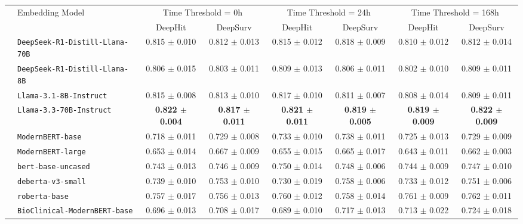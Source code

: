 \begin{adjustbox}{width=\textwidth}
\begin{tabular}{c lcccccc}
\toprule
 & \multirow{2}{*}{Embedding Model} &
 \multicolumn{2}{c}{Time Threshold = 0h} &
 \multicolumn{2}{c}{Time Threshold = 24h} &
 \multicolumn{2}{c}{Time Threshold = 168h} \\
\cmidrule(lr){3-4} \cmidrule(lr){5-6} \cmidrule(lr){7-8}
 &  & DeepHit & DeepSurv & DeepHit & DeepSurv & DeepHit & DeepSurv \\
\midrule
& \texttt{DeepSeek-R1-Distill-Llama-70B} & 0.815 $\pm$ 0.010 & 0.812 $\pm$ 0.013 & 0.815 $\pm$ 0.012 & 0.818 $\pm$ 0.009 & 0.810 $\pm$ 0.012 & 0.812 $\pm$ 0.014 \\
& \texttt{DeepSeek-R1-Distill-Llama-8B}  & 0.806 $\pm$ 0.015 & 0.803 $\pm$ 0.011 & 0.809 $\pm$ 0.013 & 0.806 $\pm$ 0.011 & 0.802 $\pm$ 0.010 & 0.809 $\pm$ 0.011 \\
& \texttt{Llama-3.1-8B-Instruct}         & 0.815 $\pm$ 0.008 & 0.813 $\pm$ 0.010 & 0.817 $\pm$ 0.010 & 0.811 $\pm$ 0.007 & 0.808 $\pm$ 0.014 & 0.809 $\pm$ 0.011 \\
& \texttt{Llama-3.3-70B-Instruct}        & \textbf{0.822 $\pm$ 0.004} & \textbf{0.817 $\pm$ 0.011} & \textbf{0.821 $\pm$ 0.011} & \textbf{0.819 $\pm$ 0.005} & \textbf{0.819 $\pm$ 0.009} & \textbf{0.822 $\pm$ 0.009} \\
& \texttt{ModernBERT-base}               & 0.718 $\pm$ 0.011 & 0.729 $\pm$ 0.008 & 0.733 $\pm$ 0.010 & 0.738 $\pm$ 0.011 & 0.725 $\pm$ 0.013 & 0.729 $\pm$ 0.009 \\
& \texttt{ModernBERT-large}              & 0.653 $\pm$ 0.014 & 0.667 $\pm$ 0.009 & 0.655 $\pm$ 0.015 & 0.665 $\pm$ 0.017 & 0.643 $\pm$ 0.011 & 0.662 $\pm$ 0.003 \\
& \texttt{bert-base-uncased}             & 0.743 $\pm$ 0.013 & 0.746 $\pm$ 0.009 & 0.750 $\pm$ 0.014 & 0.748 $\pm$ 0.006 & 0.744 $\pm$ 0.009 & 0.747 $\pm$ 0.010 \\
& \texttt{deberta-v3-small}              & 0.739 $\pm$ 0.010 & 0.753 $\pm$ 0.010 & 0.730 $\pm$ 0.019 & 0.758 $\pm$ 0.006 & 0.733 $\pm$ 0.012 & 0.751 $\pm$ 0.006 \\
& \texttt{roberta-base}                  & 0.757 $\pm$ 0.017 & 0.756 $\pm$ 0.013 & 0.760 $\pm$ 0.012 & 0.758 $\pm$ 0.014 & 0.761 $\pm$ 0.009 & 0.762 $\pm$ 0.011 \\
\midrule
& \texttt{BioClinical-ModernBERT-base}   & 0.696 $\pm$ 0.013 & 0.708 $\pm$ 0.017 & 0.689 $\pm$ 0.010 & 0.717 $\pm$ 0.013 & 0.713 $\pm$ 0.022 & 0.724 $\pm$ 0.018 \\

\end{tabular}
\end{adjustbox}
